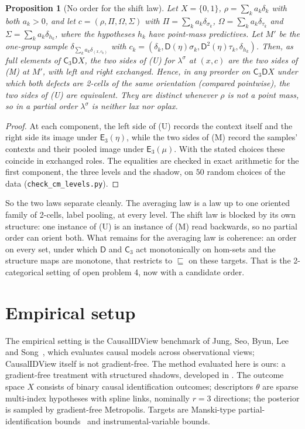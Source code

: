 \documentclass[11pt]{article}
\newtheorem{proposition}[theorem]{Proposition}
\theoremstyle{definition}
\theoremstyle{remark}
\newcommand{\D}{\mathsf{D}}
\newcommand{\C}{\mathsf{C}}
\newcommand{\E}{\mathsf{E}}
\newcommand{\ls}{\lambda^{\sigma}}
\begin{document}
\begin{proposition}[No order for the shift law]\label{prop:shift-swap}
Let $X=\{0,1\}$, $\rho=\sum_ka_k\delta_k$ with both $a_k>0$, and let $c=(\rho,\Pi,\Omega,\Sigma)$ with $\Pi=\sum_ka_k\delta_{\sigma_k}$,
$\Omega=\sum_ka_k\delta_{\tau_k}$ and $\Sigma=\sum_ka_k\delta_{h_k}$, where the hypotheses $h_k$ have point-mass predictives. Let $M'$ be the
one-group sample $\delta_{\sum_ka_k\delta_{(x,c_k)}}$ with $c_k=(\delta_k,\D(\eta)\sigma_k,\D^2(\eta)\tau_k,\delta_{h_k})$. Then, as full
elements of $\C_3\D X$, the two sides of (U) for $\ls$ at $(x,c)$ are the two sides of (M) at $M'$, with left and right exchanged.
Hence, in any preorder on $\C_3\D X$ under which both defects are 2-cells of the same orientation (compared pointwise), the two sides
of (U) are equivalent. They are distinct whenever $\rho$ is not a point mass, so in a partial order $\ls$ is neither lax nor oplax.
\end{proposition}
\begin{proof}
At each component, the left side of (U) records the context itself and the right side its image under $\E_3(\eta)$, while the two
sides of (M) record the samples' contexts and their pooled image under $\E_3(\mu)$. With the stated choices these coincide in exchanged
roles. The equalities are checked in exact arithmetic for the first component, the three levels and the shadow, on $50$ random
choices of the data (\texttt{check\_cm\_levels.py}).
\end{proof}

So the two laws separate cleanly. The averaging law is a law up to one oriented family of 2-cells, label pooling, at every level.
The shift law is blocked by its own structure: one instance of (U) is an instance of (M) read backwards, so no partial order can
orient both. What remains for the averaging law is coherence: an order on every set, under which $\D$ and $\C_3$ act monotonically on
hom-sets and the structure maps are monotone, that restricts to $\sqsubseteq$ on these targets. That is the 2-categorical setting of
open problem 4, now with a candidate order.

\section{Empirical setup}

The empirical setting is the CausalIDView benchmark of Jung, Seo, Byun, Lee and
Song~\cite{Jung2026}, which evaluates causal models across observational views; CausalIDView itself
is not gradient-free. The method evaluated here is ours: a gradient-free treatment with structured
shadows, developed in \cite[Section~51]{Awasthi-ThreeLayers}. The outcome space $X$ consists of binary causal
identification outcomes; descriptors $\theta$ are sparse multi-index hypotheses with spline links,
nominally $r=3$ directions; the posterior is sampled by gradient-free Metropolis. Targets are
Manski-type partial-identification bounds~\cite{Manski1990} and instrumental-variable bounds.
\end{document}
